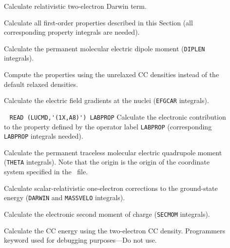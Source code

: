 \begin{description}
\item[] 
        Calculate relativistic two-electron Darwin term.
%
\item[] 
        Calculate all first-order properties described in this Section 
        (all corresponding property integrals are needed).
%
\item[] 
        Calculate the permanent molecular electric dipole moment
        (\verb+DIPLEN+ integrals).
%
\item[] 
        Compute the properties using the unrelaxed CC densities instead
        of the default relaxed densities.
%
\item[] 
        Calculate the electric field gradients at the nuclei
        (\verb+EFGCAR+ integrals).
%
\item[] \verb| |\newline
\verb|READ (LUCMD,'(1X,A8)') LABPROP|\newline
        Calculate the electronic contribution to the property defined
        by the operator label \verb+LABPROP+ (corresponding 
        \verb+LABPROP+ integrals needed).
%
\item[] 
        Calculate the permanent traceless molecular electric
        quadrupole moment (\verb+THETA+ integrals). Note that the
        origin is the origin of the coordinate system specified
        in the \molinp\ file.
%
\item[] 
        Calculate scalar-relativistic one-electron
        corrections to the ground-state
        energy (\verb+DARWIN+ and \verb+MASSVELO+ integrals).
%
\item[] 
        Calculate the electronic second moment of charge
        (\verb+SECMOM+ integrals).
%
\item[] 
        Calculate the CC energy using the two-electron CC density.
        Programmers keyword used for debugging purposes---Do not use.
%
\end{description}
